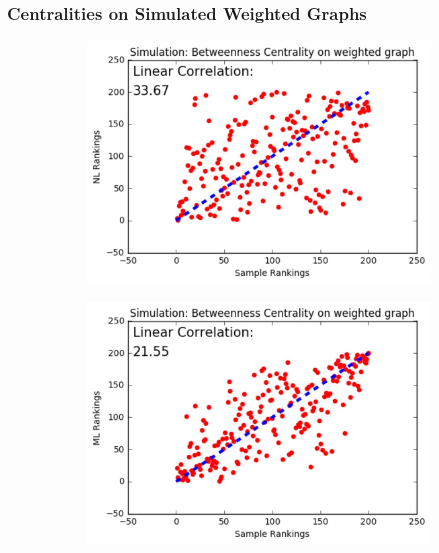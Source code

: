 \documentclass[10pt]{beamer}
\begin{document}
\begin{frame}
\frametitle{Centralities on Simulated Weighted Graphs}
\vspace{0.15in}
\begin{figure}[H]
\centering
\begin{subfigure}{.32\textwidth}
  \centering
  \includegraphics[width=0.95\linewidth]{BCW_NL.jpeg}
\end{subfigure}
\begin{subfigure}{.32\textwidth}
	\centering
    \includegraphics[width=0.95\linewidth]{BCW_ML.jpeg}
\end{subfigure}
\begin{subfigure}{.32\textwidth}
	\centering

\end{subfigure}
\end{figure}
\end{frame}
\end{document}
